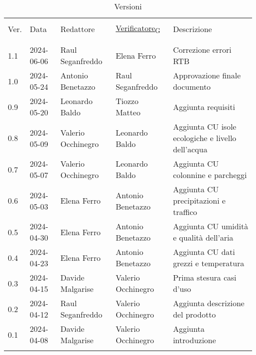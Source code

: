 \documentclass[12pt]{article}
\begin{document}


\newpage



\captionsetup[table]{list=no}
\begin{table}[!h]
	\footnotesize
	\begin{center}
		\caption*{Versioni}
		\vspace{0.5cm}
		\begin{tabular}{ l l l l p{6.1cm} }
			\hline                                                                                                          \\[-2ex]
			Ver. & Data & Redattore & \href{https://7last.github.io/docs/rtb/documentazione-interna/glossario\#verificatore}{Verificatore\textsubscript{G}} & Descrizione\\
			\\[-2ex] \hline \\[-1.5ex]
            1.1 & 2024-06-06  & Raul Seganfreddo & Elena Ferro & Correzione errori RTB\\
			1.0 & 2024-05-24 & Antonio Benetazzo & Raul Seganfreddo & Approvazione finale documento\\
			0.9 & 2024-05-20 & Leonardo Baldo & Tiozzo Matteo & Aggiunta requisiti\\
			0.8 & 2024-05-09 & Valerio Occhinegro & Leonardo Baldo & Aggiunta CU isole ecologiche e livello dell'acqua \\
			0.7 & 2024-05-07 & Valerio Occhinegro & Leonardo Baldo & Aggiunta CU colonnine e parcheggi\\
			0.6 & 2024-05-03 & Elena Ferro & Antonio Benetazzo & Aggiunta CU precipitazioni e traffico\\
			0.5 & 2024-04-30 & Elena Ferro & Antonio Benetazzo & Aggiunta CU umidità e qualità dell'aria\\
			0.4 & 2024-04-23 & Elena Ferro & Antonio Benetazzo & Aggiunta CU dati grezzi e temperatura\\
			0.3 & 2024-04-15 & Davide Malgarise & Valerio Occhinegro & Prima stesura casi d'uso\\
			0.2 & 2024-04-12 & Raul Seganfreddo & Valerio Occhinegro & Aggiunta descrizione del prodotto \\
			0.1 & 2024-04-08 & Davide Malgarise & Valerio Occhinegro & Aggiunta introduzione \\
			\\[-1.5ex] \hline
		\end{tabular}
	\end{center}
\end{table}
\captionsetup[table]{list=yes}

\newpage

\tableofcontents
\listoftables
\listoffigures

\newpage



\newpage



\newpage



\newpage


\end{document}
